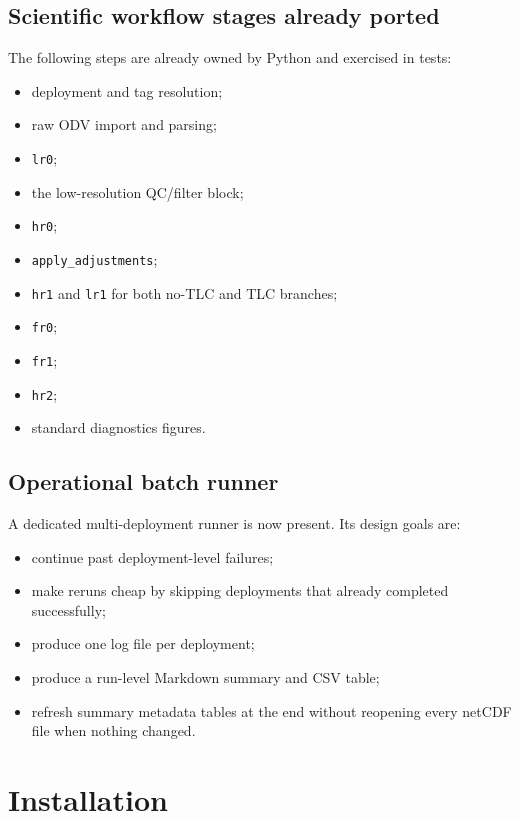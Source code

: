 \documentclass[11pt,a4paper]{article}
\newcommand{\pkg}[1]{\texttt{#1}}
\begin{document}
\subsection{Scientific workflow stages already ported}

The following steps are already owned by Python and exercised in tests:

\begin{itemize}[leftmargin=1.5em]
  \item deployment and tag resolution;
  \item raw ODV import and parsing;
  \item \pkg{lr0};
  \item the low-resolution QC/filter block;
  \item \pkg{hr0};
  \item \pkg{apply\_adjustments};
  \item \pkg{hr1} and \pkg{lr1} for both no-TLC and TLC branches;
  \item \pkg{fr0};
  \item \pkg{fr1};
  \item \pkg{hr2};
  \item standard diagnostics figures.
\end{itemize}

\subsection{Operational batch runner}

A dedicated multi-deployment runner is now present. Its design goals are:

\begin{itemize}[leftmargin=1.5em]
  \item continue past deployment-level failures;
  \item make reruns cheap by skipping deployments that already completed successfully;
  \item produce one log file per deployment;
  \item produce a run-level Markdown summary and CSV table;
  \item refresh summary metadata tables at the end without reopening every netCDF file when nothing changed.
\end{itemize}

\section{Installation}
\end{document}
